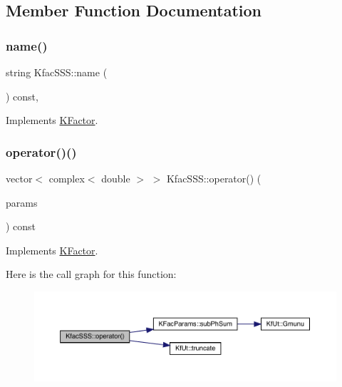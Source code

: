 \subsection{Member Function Documentation}
\mbox{\label{classKfacSSS_a2c22369b8bb0ac1be72f981c8c119719}} 
\subsubsection{\texorpdfstring{name()}{name()}}
{\footnotesize\ttfamily string Kfac\+S\+S\+S\+::name (\begin{DoxyParamCaption}{ }\end{DoxyParamCaption}) const\hspace{0.3cm}{\ttfamily [inline]}, {\ttfamily [virtual]}}



Implements \mbox{\hyperlink{classKFactor_ae578f8d6e4b525895427717da99cab6c}{K\+Factor}}.

\mbox{\label{classKfacSSS_a25ca7daf4005bf951ad67d568e3f3936}} 
\subsubsection{\texorpdfstring{operator()()}{operator()()}}
{\footnotesize\ttfamily vector$<$ complex$<$ double $>$ $>$ Kfac\+S\+S\+S\+::operator() (\begin{DoxyParamCaption}\item[{const \mbox{\hyperlink{classKFacParams}{K\+Fac\+Params}} \&}]{params }\end{DoxyParamCaption}) const\hspace{0.3cm}{\ttfamily [virtual]}}



Implements \mbox{\hyperlink{classKFactor_a012aae9ff4a07eab86d5d50b7f774285}{K\+Factor}}.

Here is the call graph for this function\+:\nopagebreak
\begin{figure}[H]
\begin{center}
\leavevmode
\includegraphics[width=350pt]{d9/d96/classKfacSSS_a25ca7daf4005bf951ad67d568e3f3936_cgraph}
\end{center}
\end{figure}


